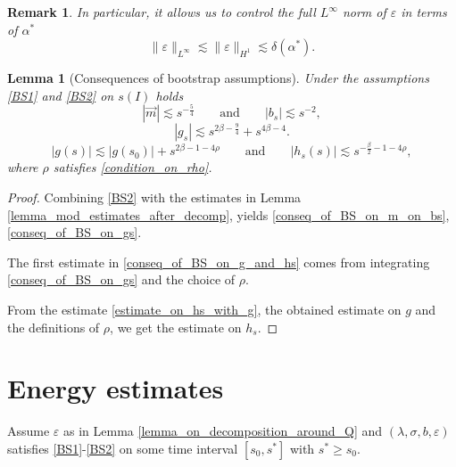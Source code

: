 \documentclass[16pt,english, oneside,reqno]{smfart}
\newcommand{\vare}{{\varepsilon}}
\newtheorem{remark}{Remark}[section]
\newtheorem{lemma}[theorem]{Lemma}
\begin{document}
\begin{remark}
    In particular, it allows us to control the full $L^{\infty}$ norm of $\vare$ in terms of $\alpha^*$
    \begin{equation}\label{L_infty_norm_of_vare_control}
        \|\vare\|_{L^{\infty}} \lesssim \|\vare\|_{H^1} \lesssim \delta(\alpha^*).
    \end{equation}
\end{remark}

\begin{lemma}[Consequences of bootstrap assumptions]
Under the assumptions \eqref{BS1} and \eqref{BS2} on $s(I)$ holds
\begin{equation}\label{conseq_of_BS_on_m_on_bs}
    |\vec{m}| \lesssim s^{-\frac{5}{4}} \qquad\text{and}\qquad  |b_s|\lesssim s^{-2},
\end{equation}
\begin{equation}\label{conseq_of_BS_on_gs}
    |g_s| \lesssim s^{2\beta-\frac{9}{4}}+s^{4\beta-4}.
\end{equation}
\begin{equation}\label{conseq_of_BS_on_g_and_hs}
    \lvert g(s) \rvert \lesssim \lvert g(s_0) \rvert  + s^{2\beta - 1-4\rho} \qquad \text{and}\qquad \lvert h_s(s) \rvert \lesssim s^{-\frac{\beta}{2}-1-4\rho},
\end{equation}
where $\rho$ satisfies \eqref{condition_on_rho}.
\end{lemma}
\begin{proof}
Combining \eqref{BS2} with the estimates in Lemma \ref{lemma_mod_estimates_after_decomp}, yields \eqref{conseq_of_BS_on_m_on_bs}, \eqref{conseq_of_BS_on_gs}.

The first estimate in \eqref{conseq_of_BS_on_g_and_hs} comes from integrating \eqref{conseq_of_BS_on_gs} and the choice of $\rho$.

From the estimate \eqref{estimate_on_hs_with_g}, the obtained estimate on $g$ and the definitions of $\rho$, we get the estimate on $h_s$.
\end{proof}
\section{Energy estimates}\label{section_energy_estimates}
Assume $\vare$ as in Lemma \ref{lemma_on_decomposition_around_Q} and 
$(\lambda,\sigma, b, \vare)$ satisfies \eqref{BS1}-\eqref{BS2} on some time interval $[s_0,s^*]$ with $s^*\geq s_0$.
\end{document}
